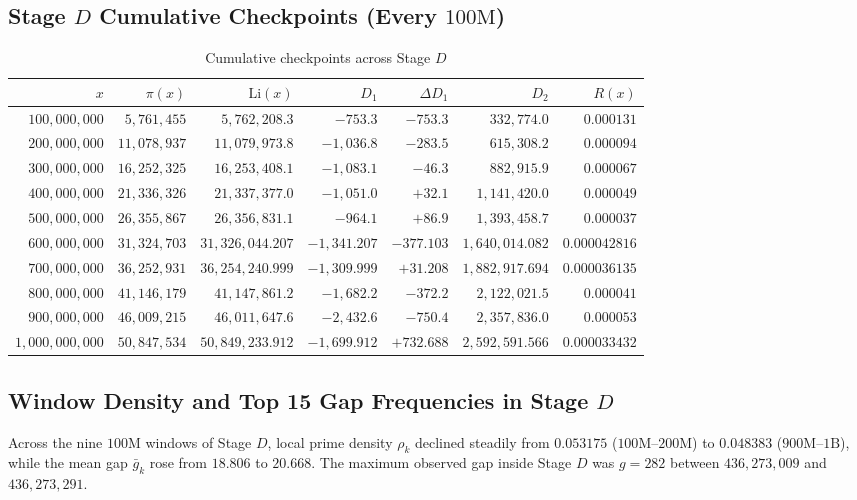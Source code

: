 \documentclass[12pt,a4paper]{article}
\begin{document}
\subsection{Stage $D$ Cumulative Checkpoints (Every $100\text{M}$)}
\begin{table}[H]
\centering
\small
\begin{tabular}{rrrrrrr}
\toprule
$x$ & $\pi(x)$ & $\mathrm{Li}(x)$ & $D_1$ & $\Delta D_1$ & $D_2$ & $R(x)$ \\
\midrule
$100{,}000{,}000$ & $5{,}761{,}455$ & $5{,}762{,}208.3$ & $-753.3$ & $-753.3$ & $332{,}774.0$ & $0.000131$ \\
$200{,}000{,}000$ & $11{,}078{,}937$ & $11{,}079{,}973.8$ & $-1{,}036.8$ & $-283.5$ & $615{,}308.2$ & $0.000094$ \\
$300{,}000{,}000$ & $16{,}252{,}325$ & $16{,}253{,}408.1$ & $-1{,}083.1$ & $-46.3$ & $882{,}915.9$ & $0.000067$ \\
$400{,}000{,}000$ & $21{,}336{,}326$ & $21{,}337{,}377.0$ & $-1{,}051.0$ & $+32.1$ & $1{,}141{,}420.0$ & $0.000049$ \\
$500{,}000{,}000$ & $26{,}355{,}867$ & $26{,}356{,}831.1$ & $-964.1$ & $+86.9$ & $1{,}393{,}458.7$ & $0.000037$ \\
$600{,}000{,}000$ & $31{,}324{,}703$ & $31{,}326{,}044.207$ & $-1{,}341.207$ & $-377.103$ & $1{,}640{,}014.082$ & $0.000042816$ \\
$700{,}000{,}000$ & $36{,}252{,}931$ & $36{,}254{,}240.999$ & $-1{,}309.999$ & $+31.208$ & $1{,}882{,}917.694$ & $0.000036135$ \\
$800{,}000{,}000$ & $41{,}146{,}179$ & $41{,}147{,}861.2$ & $-1{,}682.2$ & $-372.2$ & $2{,}122{,}021.5$ & $0.000041$ \\
$900{,}000{,}000$ & $46{,}009{,}215$ & $46{,}011{,}647.6$ & $-2{,}432.6$ & $-750.4$ & $2{,}357{,}836.0$ & $0.000053$ \\
$1{,}000{,}000{,}000$ & $50{,}847{,}534$ & $50{,}849{,}233.912$ & $-1{,}699.912$ & $+732.688$ & $2{,}592{,}591.566$ & $0.000033432$ \\
\bottomrule
\end{tabular}
\caption{Cumulative checkpoints across Stage $D$}
\end{table}

\subsection{Window Density and Top 15 Gap Frequencies in Stage $D$}
Across the nine $100\text{M}$ windows of Stage $D$, local prime density $\rho_k$ declined steadily from $0.053175$ ($100\text{M}$--$200\text{M}$) to $0.048383$ ($900\text{M}$--$1\text{B}$), while the mean gap $\bar{g}_k$ rose from $18.806$ to $20.668$. The maximum observed gap inside Stage $D$ was $g = 282$ between $436{,}273{,}009$ and $436{,}273{,}291$.
\end{document}

